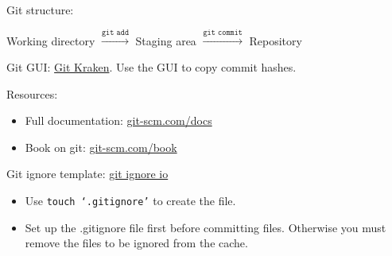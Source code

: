 \documentclass[12pt]{article}
\newcommand{\code}[1]{\texttt{#1}}
\begin{document}
Git structure: 
\begin{center}
    Working directory $\overset{\code{git add}}{\longrightarrow}$ Staging area $\overset{\code{git commit}}{\longrightarrow}$ Repository
\end{center}

Git GUI: \href{https://www.gitkraken.com}{Git Kraken}. Use the GUI to copy commit hashes.

Resources:
\begin{itemize}
    \item 
    Full documentation: \href{https://git-scm.com/docs/}{git-scm.com/docs}
    \item
    Book on git: \href{https://git-scm.com/book/en/v2}{git-scm.com/book}
\end{itemize}

Git ignore template: \href{https://www.toptal.com/developers/gitignore}{git ignore io}
\begin{itemize}
    \item 
    Use \code{touch `.gitignore'} to create the file.
    \item
    Set up the .gitignore file first before committing files. Otherwise you must remove the files to be ignored from the cache.
\end{itemize}
\end{document}
